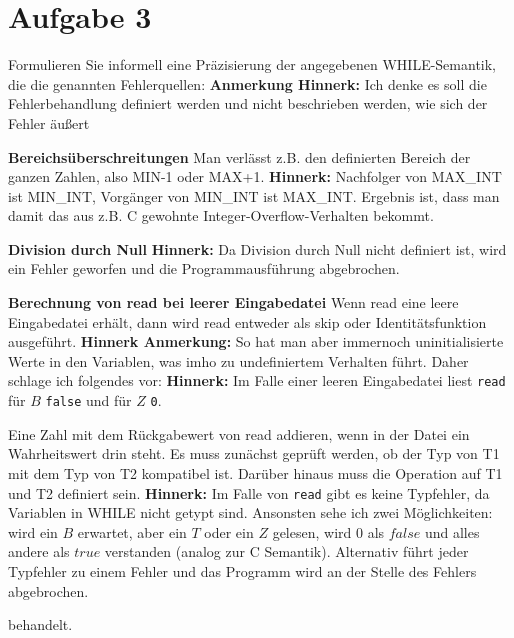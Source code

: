\documentclass[ngerman,a4paper]{report}
\begin{document}
\section*{Aufgabe 3}
Formulieren Sie informell eine Präzisierung der angegebenen WHILE-Semantik, die die genannten Fehlerquellen:
\textbf{Anmerkung Hinnerk:} Ich denke es soll die Fehlerbehandlung definiert werden und nicht beschrieben werden, wie sich der Fehler äußert
\begin{compactenum}
\item [\textbf{Bereichsüberschreitungen}] Man verlässt z.B. den definierten Bereich der ganzen Zahlen, also MIN-1 oder MAX+1. 
	\textbf{Hinnerk:} Nachfolger von MAX_INT ist MIN_INT, Vorgänger von MIN_INT ist MAX_INT. Ergebnis ist, dass man damit das aus z.B. C gewohnte Integer-Overflow-Verhalten bekommt.
\item [\textbf{Division durch Null}] 
	\textbf{Hinnerk:} Da Division durch Null nicht definiert ist, wird ein Fehler geworfen und die Programmausführung abgebrochen.
\item [\textbf{Berechnung von read bei leerer Eingabedatei}] Wenn read eine leere Eingabedatei erhält, dann wird read entweder als skip oder Identitätsfunktion ausgeführt.
	\textbf{Hinnerk Anmerkung:} So hat man aber immernoch uninitialisierte Werte in den Variablen, was imho zu undefiniertem Verhalten führt. Daher schlage ich folgendes vor:
	\textbf{Hinnerk:} Im Falle einer leeren Eingabedatei liest \lstinline{read} für $B$ \lstinline{false} und für $Z$ \lstinline{0}.
\item [\textbf{Typkonflikte}] Eine Zahl mit dem Rückgabewert von read addieren, wenn in der Datei ein Wahrheitswert drin steht. Es muss zunächst geprüft werden, ob der Typ von T1 mit dem Typ von T2 kompatibel ist. Darüber hinaus muss die Operation auf T1 und T2 definiert sein.
	\textbf{Hinnerk:} Im Falle von \lstinline{read} gibt es keine Typfehler, da Variablen in WHILE nicht getypt sind.
	Ansonsten sehe ich zwei Möglichkeiten: wird ein $B$ erwartet, aber ein $T$ oder ein $Z$ gelesen, wird $0$ als $false$ und alles andere als $true$ verstanden (analog zur C Semantik). Alternativ führt jeder Typfehler zu einem Fehler und das Programm wird an der Stelle des Fehlers abgebrochen.
\end{compactenum}
behandelt.
\end{document}
